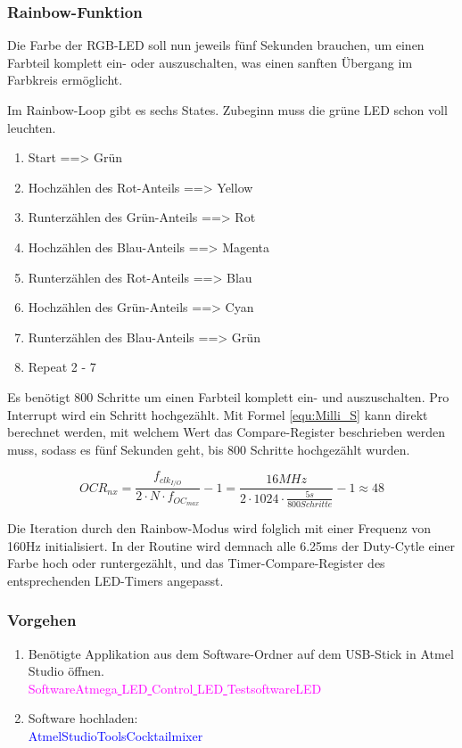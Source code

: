 \subsubsection{Rainbow-Funktion}

Die Farbe der RGB-LED soll nun jeweils fünf Sekunden brauchen, um einen Farbteil komplett ein- oder auszuschalten, was einen sanften Übergang im Farbkreis ermöglicht.

Im Rainbow-Loop gibt es sechs States. Zubeginn muss die grüne LED schon voll leuchten.
\begin{enumerate}
\item Start ==> Grün
\item Hochzählen des Rot-Anteils ==> Yellow
\item Runterzählen des Grün-Anteils ==> Rot
\item Hochzählen des Blau-Anteils ==> Magenta
\item Runterzählen des Rot-Anteils ==> Blau
\item Hochzählen des Grün-Anteils ==> Cyan
\item Runterzählen des Blau-Anteils ==> Grün
\item Repeat 2 - 7
\end{enumerate}

Es benötigt 800 Schritte um einen Farbteil komplett ein- und auszuschalten. Pro Interrupt wird ein Schritt hochgezählt. Mit Formel \ref{equ:Milli_S} kann direkt berechnet werden, mit welchem Wert das Compare-Register beschrieben werden muss, sodass es fünf Sekunden geht, bis 800 Schritte hochgezählt wurden.

\begin{equation}
OCR_{nx} = \frac{f_{clk_{I/O}}}{2 \cdot N \cdot f_{OC_{max}}} - 1 = \frac{16MHz}{2 \cdot 1024 \cdot \frac{5s}{800 Schritte}} - 1 \approx 48
\label{equ:Milli_S}
\end{equation}

Die Iteration durch den Rainbow-Modus wird folglich mit einer Frequenz von 160Hz initialisiert. In der Routine wird demnach alle 6.25ms der Duty-Cytle einer Farbe hoch oder runtergezählt, und das Timer-Compare-Register des entsprechenden LED-Timers angepasst.

\subsubsection{Vorgehen}

\begin{enumerate}
\item Benötigte Applikation aus dem Software-Ordner auf dem USB-Stick in Atmel Studio öffnen.\\
\textcolor{magenta}{Software\textrightarrow Atmega\underline{ }LED\underline{ }Control\underline{ }LED\underline{ }Testsoftware\textrightarrow LED}\\

\item Software hochladen:\\
\textcolor{blue}{AtmelStudio\textrightarrow Tools\textrightarrow Cocktailmixer}\\

\end{enumerate}
